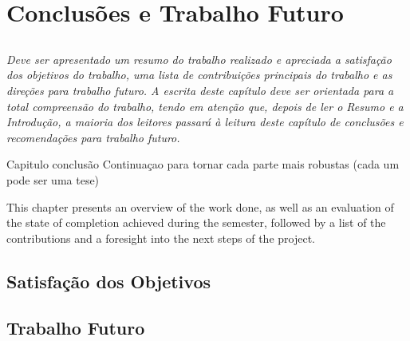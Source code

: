 
\chapter{Conclusões e Trabalho Futuro} \label{chap:concl}

\section*{}

\textit{
Deve ser apresentado um resumo do trabalho realizado e apreciada a
satisfação dos objetivos do trabalho, uma lista de contribuições
principais do trabalho e as direções para trabalho futuro.
A escrita deste capítulo deve ser orientada para a total compreensão
do trabalho, tendo em atenção que, depois de ler o Resumo e a
Introdução, a maioria dos leitores passará à leitura deste capítulo de
conclusões e recomendações para trabalho futuro.}

Capitulo conclusão
Continuaçao para tornar cada parte mais robustas (cada um pode ser uma tese)

This chapter presents an overview of the work done, as well as an evaluation of the state of completion achieved during the semester, followed by a list of the contributions and a foresight into the next steps of the project. 

\section{Satisfação dos Objetivos}



\section{Trabalho Futuro}

